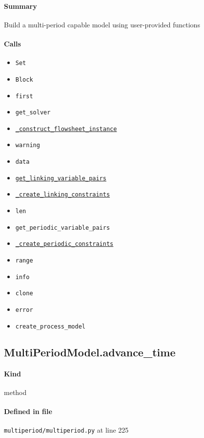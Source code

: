 \documentclass[11pt]{report}
\begin{document}
\paragraph{Summary} Build a multi-period capable model using user-provided functions
\paragraph{Calls}
\begin{itemize}[leftmargin=*]
  \item \texttt{Set}
  \item \texttt{Block}
  \item \texttt{first}
  \item \texttt{get\_solver}
  \item \hyperref[def:multiperiod-multiperiod.py:MultiPeriodModel._construct_flowsheet_instance:L315]{\texttt{\_construct\_flowsheet\_instance}}
  \item \texttt{warning}
  \item \texttt{data}
  \item \hyperref[def:multiperiod-tests-test_multiperiod.py:get_linking_variable_pairs:L58]{\texttt{get\_linking\_variable\_pairs}}
  \item \hyperref[def:multiperiod-multiperiod.py:MultiPeriodModel._create_linking_constraints:L299]{\texttt{\_create\_linking\_constraints}}
  \item \texttt{len}
  \item \texttt{get\_periodic\_variable\_pairs}
  \item \hyperref[def:multiperiod-multiperiod.py:MultiPeriodModel._create_periodic_constraints:L307]{\texttt{\_create\_periodic\_constraints}}
  \item \texttt{range}
  \item \texttt{info}
  \item \texttt{clone}
  \item \texttt{error}
  \item \texttt{create\_process\_model}
\end{itemize}
\subsection{MultiPeriodModel.advance\_time}
\label{def:multiperiod-multiperiod.py:MultiPeriodModel.advance_time:L225}
\paragraph{Kind} method
\paragraph{Defined in file} \texttt{multiperiod/multiperiod.py} at line 225
\end{document}
